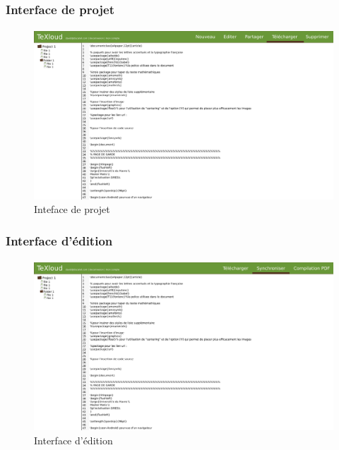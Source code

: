 \documentclass[a4paper,12pt]{article}
\begin{document}
\newpage
\subsubsection{Interface de projet}
\paragraph{}
\begin{figure}[!ht]
\begin{center}
  \includegraphics[width=1\textwidth, angle=90]{../layout/layout_texloud_project.png}
\end{center}
  \caption{Inteface de projet}
  \label{uiProject}
\end{figure}

\newpage
\subsubsection{Interface d'édition}
\paragraph{}
\begin{figure}[!ht]
\begin{center}
  \includegraphics[width=1\textwidth, angle=90]{../layout/layout_texloud_std.png}
\end{center}
  \caption{Interface d'édition}
  \label{uiEdit}
\end{figure}
\end{document}
